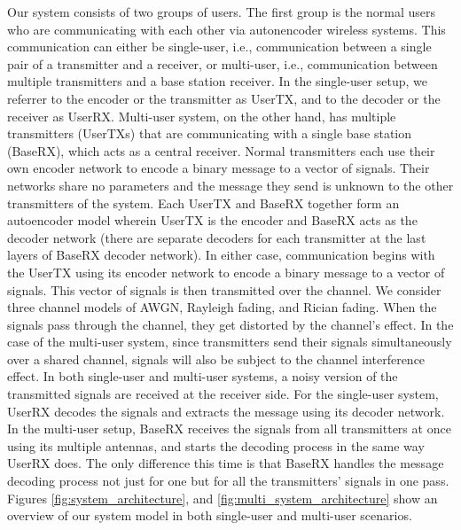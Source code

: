 Our system consists of two groups of users. The first group is the normal users who are communicating with each other via autonencoder wireless systems. This communication can either be single-user, i.e., communication between a single pair of a transmitter and a receiver, or multi-user, i.e., communication between multiple transmitters and a base station receiver. In the single-user setup, we referrer to the encoder or the transmitter as UserTX, and to the decoder or the receiver as UserRX. Multi-user system, on the other hand, has multiple transmitters (UserTXs) that are communicating with a single base station (BaseRX), which acts as a central receiver. Normal transmitters each use their own encoder network to encode a binary message to a vector of signals. Their networks share no parameters and the message they send is unknown to the other transmitters of the system. Each UserTX and BaseRX together form an autoencoder model wherein UserTX is the encoder and BaseRX acts as the decoder network (there are separate decoders for each transmitter at the last layers of BaseRX decoder network). In either case, communication begins with the UserTX using its encoder network to encode a binary message to a vector of signals. This vector of signals is then transmitted over the channel. We consider three channel models of AWGN, Rayleigh fading, and Rician fading. When the signals pass through the channel, they get distorted by the channel's effect. In the case of the multi-user system, since transmitters send their signals simultaneously over a shared channel, signals will also be subject to the channel interference effect. In both single-user and multi-user systems, a noisy version of the transmitted signals are received at the receiver side. For the single-user system, UserRX decodes the signals and extracts the message using its decoder network. In the multi-user setup, BaseRX receives the signals from all transmitters at once using its multiple antennas, and starts the decoding process in the same way UserRX does. The only difference this time is that BaseRX handles the message decoding process not just for one but for all the transmitters' signals in one pass. Figures \ref{fig:system_architecture}, and \ref{fig:multi_system_architecture} show an overview of our system model in both single-user and multi-user scenarios.

